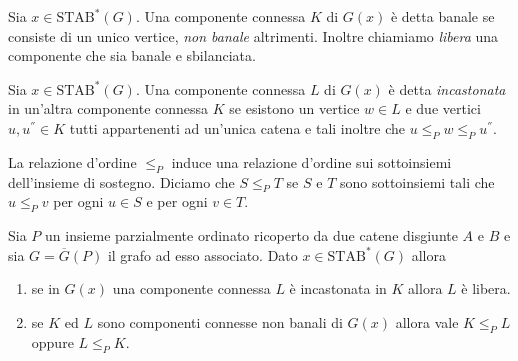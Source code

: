 \begin{definition}
	Sia \(x\in\text{STAB}^*(G)\). Una componente connessa \(K\) di \(G(x)\) è detta banale se consiste di un unico vertice, \emph{non banale} altrimenti. Inoltre chiamiamo \emph{libera} una componente che sia banale e sbilanciata. 
\end{definition}
\begin{definition}
	Sia \(x\in\text{STAB}^{*}(G)\). Una componente connessa \(L\) di \(G(x)\) è detta \emph{incastonata} in un'altra componente connessa \(K\) se esistono un vertice \(w\in L\) e due vertici \(u,u^{''}\in K\) tutti appartenenti ad un'unica catena e tali inoltre che \(u\le_{P}w\le_{P}u^{''}\). 
\end{definition}
La relazione d'ordine \(\le_{P}\) induce una relazione d'ordine sui sottoinsiemi dell'insieme di sostegno. Diciamo che \(S\le_{P}T\) se \(S\) e \(T\) sono sottoinsiemi tali che \(u\le_{P}v\) per ogni \(u\in S\) e per ogni \(v\in T\). 
\begin{lemma}
	\label{inlaylemma} Sia \(P\) un insieme parzialmente ordinato ricoperto da due catene disgiunte \(A\) e \(B\) e sia \(G=\overline{G}(P)\) il grafo ad esso associato. Dato \(x\in\text{STAB}^{*}(G)\) allora 
	\begin{enumerate}
		\item se in \(G(x)\) una componente connessa \(L\) è incastonata in \(K\) allora \(L\) è libera. 
		\item se \(K\) ed \(L\) sono componenti connesse non banali di \(G(x)\) allora vale \(K\le_{P}L\) oppure \(L\le_{P}K\). 
	\end{enumerate}
\end{lemma}

